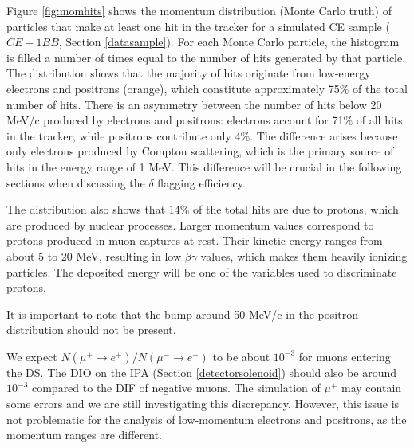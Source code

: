 Figure \ref{fig:momhits} shows the 
momentum distribution (Monte Carlo truth) of 
particles that make at least one hit in the 
tracker for a simulated CE sample ($CE-1BB$, 
Section \ref{datasample}). 
For each Monte Carlo particle, the 
histogram is filled a number of times 
equal to the number of hits generated 
by that particle.
The distribution shows that the 
majority of hits originate from 
low-energy electrons and positrons 
(orange), which constitute approximately 
75\% of the total number of hits. 
There is an asymmetry between the 
number of hits below 20 MeV/c 
produced by electrons and positrons: 
electrons account for 
71\% of all hits in 
the tracker, while positrons 
contribute only 4\%. The difference  
arises because only electrons produced by Compton scattering, which is 
the primary source of hits in the energy 
range of 1 MeV. This difference 
will be crucial in 
the following sections when discussing 
the $\delta$ flagging efficiency.

The distribution also shows that 14\% of 
the total hits are due to protons, 
which are produced by nuclear processes. 
Larger momentum values correspond to protons produced in muon 
captures at rest. Their kinetic energy ranges from about 
5 to 20 MeV, resulting in low $\beta \gamma$ values, 
which makes them heavily ionizing particles. 
The deposited energy will be 
one of the variables used to discriminate protons. 

It is important to note that the bump 
around 50 MeV/c in the positron distribution should not be 
present.  

We expect $N(\mu^+ \rightarrow e^+ )/N(\mu^- \rightarrow e^- )$ 
to be about $10^{-3}$ for muons entering the DS. The DIO on the IPA 
(Section \ref{detectorsolenoid}) should also be around $10^{-3}$ compared to the DIF of 
negative muons. The simulation of $\mu^+$ may 
contain some errors and we are still 
investigating this discrepancy. However, this issue is not problematic for the analysis 
of low-momentum electrons and positrons, 
as the momentum ranges are different.

